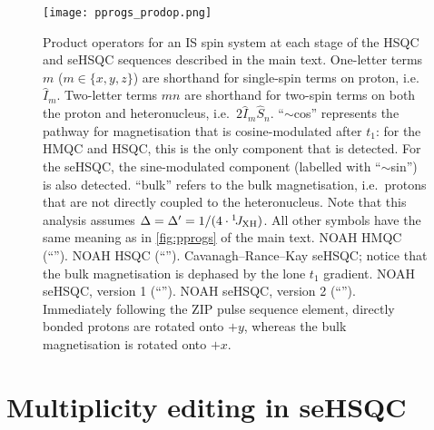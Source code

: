 \begin{figure}
    \centering
    \texttt{[image: pprogs\_prodop.png]}
    {\label{fig:pprogs_prodop_hmqc}}
    {\label{fig:pprogs_prodop_hsqc}}
    {\label{fig:pprogs_prodop_crk}}
    {\label{fig:pprogs_prodop_spv1}}
    {\label{fig:pprogs_prodop_spv2}}
    \caption{
        Product operators for an IS spin system at each stage of the HSQC and seHSQC sequences described in the main text.
        One-letter terms $m$ ($m \in \{x, y, z\}$) are shorthand for single-spin terms on proton, i.e.\ $\hat{I}_m$.
        Two-letter terms $mn$ are shorthand for two-spin terms on both the proton and heteronucleus, i.e.\ $2\hat{I}_m\hat{S}_n$.
        ``$\sim$cos'' represents the pathway for  magnetisation that is cosine-modulated after $t_1$: for the HMQC and HSQC, this is the only component that is detected.
        For the seHSQC, the sine-modulated  component (labelled with ``$\sim$sin'') is also detected.
        ``bulk'' refers to the bulk  magnetisation, i.e.\ protons that are not directly coupled to the heteronucleus.
        Note that this analysis assumes $\Delta = \Delta' = 1/(4\cdot\onejxh)$.
        All other symbols have the same meaning as in \cref{fig:pprogs} of the main text.
        \textbf{} NOAH HMQC (``\noahM{}'').
        \textbf{} NOAH HSQC (``\noahS{}'').
        \textbf{} Cavanagh--Rance--Kay seHSQC; notice that the bulk magnetisation is dephased by the lone $t_1$ gradient.
        \textbf{} NOAH seHSQC, version 1 (``\noahSpa{}'').
        \textbf{} NOAH seHSQC, version 2 (``\noahSpb{}'').
        Immediately following the ZIP pulse sequence element, directly bonded protons are rotated onto $+y$, whereas the bulk magnetisation is rotated onto $+x$.
    }
    \label{fig:pprogs_prodop}
\end{figure}

\section{Multiplicity editing in seHSQC}


